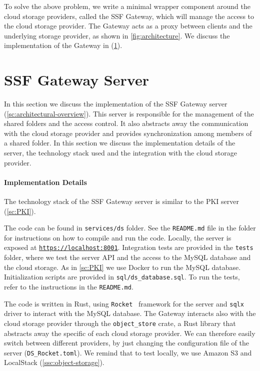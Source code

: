 To solve the above problem, we write a minimal wrapper component around
the cloud storage providers, called the SSF Gateway, which will manage
the access to the cloud storage provider. The Gateway acts as a proxy
between clients and the underlying storage provider, as shown in
\cref{fig:architecture}. We discuss the implementation of the
Gateway in (\cref{sc:ssf-proxy-server}).


\section{SSF Gateway Server}\label{sc:ssf-proxy-server}

In this section we discuss the implementation of the SSF Gateway server 
(\cref{sc:architectural-overview}). This server is responsible for the
management of the shared folders and the access control.
It also abstracts away the communication with the cloud storage provider
and provides synchronization among members of a shared folder.
In this section we discuss the implementation details
of the server, the technology stack used and the
integration with the cloud storage provider.

\paragraph{Implementation Details}
The technology stack of the SSF Gateway server
is similar to the PKI server (\cref{sc:PKI}).

The code can be found in \texttt{services/ds} folder.
See the \texttt{README.md} file in the folder for instructions
on how to compile and run the code.
Locally, the server is exposed at \texttt{\url{https://localhost:8001}}.
Integration tests are provided in the \texttt{tests} folder,
where we test the server API and the access to the 
MySQL database and the cloud storage.
As in \cref{sc:PKI} we use Docker to run the MySQL database.
Initialization scripts are provided in \texttt{sql/ds\_database.sql}.
To run the tests, refer to the instructions in the \texttt{README.md}.

The code is written in Rust, using \texttt{Rocket}~\cite{Rocket}
framework for the server and \texttt{sqlx} driver to interact
with the MySQL database.
The Gateway interacts also with the cloud storage provider
through the \texttt{object\_store} crate, a Rust library
that abstracts away the specific of each cloud storage provider.
We can therefore easily switch between different providers, by
just changing the configuration file of the server (\texttt{DS\_Rocket.toml}).
We remind that to test locally, we use Amazon S3 and
LocalStack (\cref{ssc:object-storage}).

